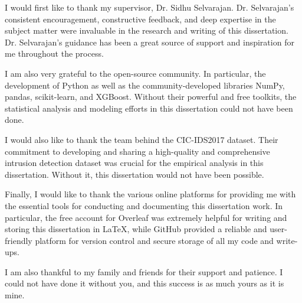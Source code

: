 I would first like to thank my supervisor, Dr. Sidhu Selvarajan. Dr. Selvarajan's consistent encouragement, constructive feedback, and deep expertise in the subject matter were invaluable in the research and writing of this dissertation. Dr. Selvarajan's guidance has been a great source of support and inspiration for me throughout the process. 

I am also very grateful to the open-source community. In particular, the development of Python as well as the community-developed libraries NumPy, pandas, scikit-learn, and XGBoost. Without their powerful and free toolkits, the statistical analysis and modeling efforts in this dissertation could not have been done.

 I would also like to thank the team behind the CIC-IDS2017 dataset. Their commitment to developing and sharing a high-quality and comprehensive intrusion detection dataset was crucial for the empirical analysis in this dissertation. Without it, this dissertation would not have been possible. 
 
 Finally, I would like to thank the various online platforms for providing me with the essential tools for conducting and documenting this dissertation work. In particular, the free account for Overleaf was extremely helpful for writing and storing this dissertation in \LaTeX, while GitHub provided a reliable and user-friendly platform for version control and secure storage of all my code and write-ups. 
 
 I am also thankful to my family and friends for their support and patience. I could not have done it without you, and this success is as much yours as it is mine.
